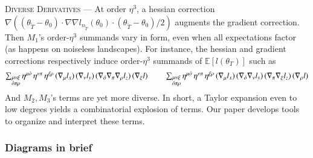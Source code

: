 \documentclass[anon,12pt]{colt2021} %
\newcommand{\squash}{\vspace{-0.15cm}}
\newcommand{\expct}[1]{\mathbb{E}\left[#1\right]}
\newcommand{\omicron}{{\acute{o}}}
\begin{document}
            \textsc{Diverse Derivatives} --- 
            At order $\eta^3$, a hessian correction $\nabla((\theta_{{\tilde T}} -
            \theta_0) \cdot \nabla \nabla l_{n_{\tilde T}}(\theta_0) \cdot
            (\theta_{{\tilde T}} - \theta_0)/2)$ augments the gradient
            correction.
            Then $M_1$'s order-$\eta^3$ summands vary in form, even when all
            expectations factor (as happens on noiseless landscapes).  For
            instance, the hessian and gradient corrections respectively induce
            order-$\eta^3$ summands of $\expct{l(\theta_T)}$ such as
            \squash
            $$
                \textstyle
                \sum_{\substack{\mu\nu\xi \\ \omicron\pi\rho}}
                    \eta^{\mu\omicron} \, \eta^{\nu\pi} \, \eta^{\xi\rho}
                    \,
                    (\nabla_\mu l_x)
                    \,
                    (\nabla_\nu l_y)
                    \,
                    (\nabla_\omicron\nabla_\pi\nabla_\rho l_z)
                    \,
                    (\nabla_\xi l)
                \hspace{0.75cm}
                \sum_{\substack{\mu\nu\xi \\ \omicron\pi\rho}}
                    \eta^{\mu\omicron} \, \eta^{\nu\pi} \, \eta^{\xi\rho}
                    \,
                    (\nabla_\mu l_x)
                    \,
                    (\nabla_\omicron\nabla_\nu l_y)
                    \,
                    (\nabla_\pi \nabla_\xi l_z)
                    \,
                    (\nabla_\rho l)
                \squash
            $$
            And $M_2, M_3$'s terms are yet more diverse.  In short, a Taylor
            expansion even to low degrees yields a combinatorial explosion of
            terms.  Our paper develops tools to organize and interpret these
            terms.

            \subsubsection{Diagrams in brief}\label{sect:diagrams-in-brief}
\end{document}

